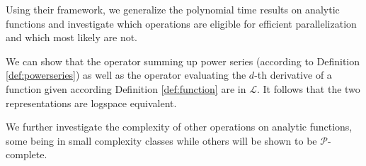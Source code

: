 \documentclass{article}
\newcommand{\p}{\ensuremath{\mathcal P}\xspace}
\newcommand{\cl}{\ensuremath{\mathcal{L}}\xspace}
\begin{document}
Using their framework, we generalize the polynomial time results on analytic functions and investigate which operations are eligible for efficient parallelization and which most likely are not.

We can show that the operator summing up power series (according to Definition \ref{def:powerseries}) as well as the operator evaluating the $d$-th derivative of a function given according Definition \ref{def:function} are in \cl.
It follows that the two representations are logspace equivalent.

We further investigate the complexity of other operations on analytic functions, some being in small complexity classes while others will be shown to be \p-complete.


{}
\end{document}
